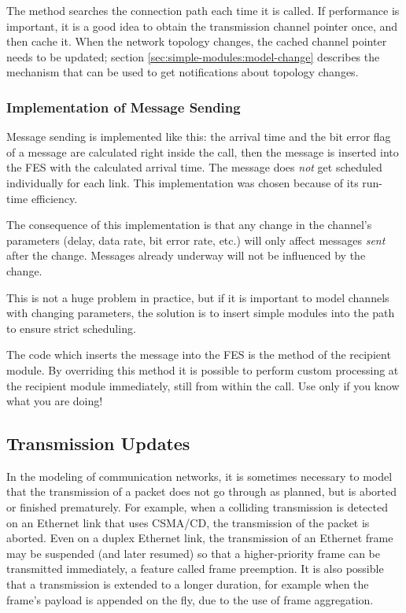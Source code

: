 The  method searches the connection path each
time it is called. If performance is important, it is a good idea to obtain
the transmission channel pointer once, and then cache it. When the network topology
changes, the cached channel pointer needs to be updated; section
\ref{sec:simple-modules:model-change} describes the mechanism that can
be used to get notifications about topology changes.


\subsubsection{Implementation of Message Sending}
\label{sec:simple-modules:implementation-of-message-sending}

Message sending is implemented like this: the arrival time
and the bit error flag of a message are calculated right inside
the  call, then the message is inserted into the FES
with the calculated arrival time. The message does \textit{not} get scheduled
individually for each link. This implementation was chosen because of its
run-time efficiency.

\begin{note}
   The consequence of this implementation is that any change in the
   channel's parameters (delay, data rate, bit error rate, etc.) will only affect
   messages \textit{sent} after the change. Messages already underway will not
   be influenced by the change.

   This is not a huge problem in practice, but if it is important to model
   channels with changing parameters, the solution is to insert simple modules
   into the path to ensure strict scheduling.
\end{note}

The code which inserts the message into the FES is the 
method of the recipient module. By overriding this method it is possible
to perform custom processing at the recipient module immediately, still
from within the  call. Use only if you know what you are doing!


\subsection{Transmission Updates}
\label{sec:simple-modules:transmission-updates}
\label{sec:simple-modules:aborting-transmissions}

In the modeling of communication networks, it is sometimes necessary to model
that the transmission of a packet does not go through as planned, but is aborted
or finished prematurely. For example, when a colliding transmission is detected
on an Ethernet link that uses CSMA/CD, the transmission of the packet is
aborted. Even on a duplex Ethernet link, the transmission of an Ethernet frame
may be suspended (and later resumed) so that a higher-priority frame can be
transmitted immediately, a feature called frame preemption. It is also possible
that a transmission is extended to a longer duration, for example when the
frame's payload is appended on the fly, due to the use of frame aggregation.

